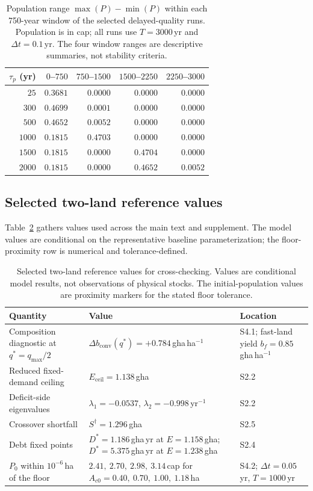 \documentclass[11pt,a4paper]{article}
\newcommand{\dconv}{\Delta b_{\mathrm{conv}}}
\newcommand{\Eceil}{E_{\mathrm{ceil}}}
\begin{document}
\begin{table}[htbp]
\centering\small
\caption{Population range $\max(P)-\min(P)$ within each 750-year window of the selected delayed-quality runs. Population is in cap; all runs use $T=3000$\,yr and $\Delta t=0.1$\,yr. The four window ranges are descriptive summaries, not stability criteria.}
\label{tab:si_taup}
\begin{tabular}{r r r r r}
\toprule
$\tau_p$ (yr) & $0$--$750$ & $750$--$1500$ & $1500$--$2250$ & $2250$--$3000$ \\
\midrule
$25$ & $0.3681$ & $0.0000$ & $0.0000$ & $0.0000$ \\
$300$ & $0.4699$ & $0.0001$ & $0.0000$ & $0.0000$ \\
$500$ & $0.4652$ & $0.0052$ & $0.0000$ & $0.0000$ \\
$1000$ & $0.1815$ & $0.4703$ & $0.0000$ & $0.0000$ \\
$1500$ & $0.1815$ & $0.0000$ & $0.4704$ & $0.0000$ \\
$2000$ & $0.1815$ & $0.0000$ & $0.4652$ & $0.0052$ \\
\bottomrule
\end{tabular}
\end{table}

\subsection{Selected two-land reference values}

Table~\ref{tab:si_keyvalues} gathers values used across the main text and supplement. The model values are conditional on the representative baseline parameterization; the floor-proximity row is numerical and tolerance-defined.

\begin{table}[htbp]
\centering\small
\caption{Selected two-land reference values for cross-checking. Values are conditional model results, not observations of physical stocks. The initial-population values are proximity markers for the stated floor tolerance.}
\label{tab:si_keyvalues}
\begin{tabularx}{\textwidth}{>{\raggedright\arraybackslash}p{} >{\raggedright\arraybackslash}p{} X}
\toprule
Quantity & Value & Location \\
\midrule
Composition diagnostic at $q^*=q_{\max}/2$ & $\dconv(q^*)=+0.784$\,gha\,ha$^{-1}$ & S4.1; fast-land yield $b_f=0.85$\,gha\,ha$^{-1}$ \\
Reduced fixed-demand ceiling & $\Eceil=1.138$\,gha & S2.2 \\
Deficit-side eigenvalues & $\lambda_1=-0.0537$, $\lambda_2=-0.998$\,yr$^{-1}$ & S2.2 \\
Crossover shortfall & $S^\dagger=1.296$\,gha & S2.5 \\
Debt fixed points & $D^*=1.186$\,gha\,yr at $E=1.158$\,gha; $D^*=5.375$\,gha\,yr at $E=1.238$\,gha & S2.4 \\
$P_0$ within $10^{-6}$\,ha of the floor & $2.41,\ 2.70,\ 2.98,\ 3.14$\,cap for $A_{c0}=0.40,\ 0.70,\ 1.00,\ 1.18$\,ha & S4.2; $\Delta t=0.05$\,yr, $T=1000$\,yr \\
\bottomrule
\end{tabularx}
\end{table}
\end{document}
